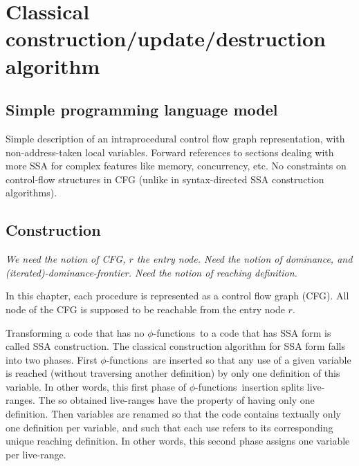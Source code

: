        \chapter{Classical construction/update/destruction algorithm }

\def\phiops{$\phi$-functions}
\def\phiop{$\phi$-function}
\section{Simple programming language model}

Simple description of an intraprocedural control flow graph
representation, with non-address-taken local variables.
Forward references to sections dealing with more SSA for complex
features like memory, concurrency, etc.
No constraints on control-flow structures in CFG
(unlike in syntax-directed SSA construction algorithms).


\section{Construction}
{\em We need the notion of CFG, $r$ the entry node. Need the notion of dominance, and (iterated)-dominance-frontier. Need the notion of reaching definition.}

In this chapter, each procedure is represented as a control flow graph (CFG). All node of the CFG is supposed to be reachable from the entry node $r$.

Transforming a code that has no \phiops\ to a code that has SSA form is called SSA construction. The classical construction algorithm for SSA form falls into two phases. 
First \phiops\ are inserted so that any use of a given variable is reached (without traversing another definition) by only one definition of this variable. In other words, this first phase of \phiops\ insertion splits live-ranges. The so obtained live-ranges have the property of having only one definition.
Then variables are renamed so that the code contains textually only one definition per variable, and such that each use refers to its corresponding unique reaching definition. In other words, this second phase assigns one variable per live-range. 

